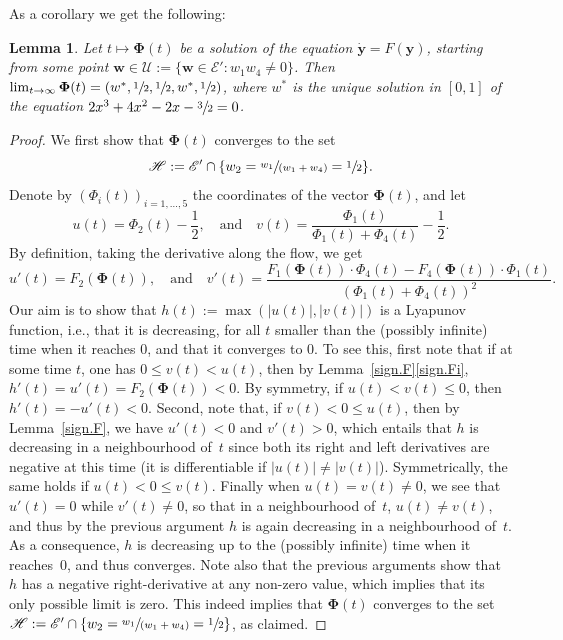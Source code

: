 \documentclass[11pt]{article}
\newcommand{\ie}{i.e.,\xspace}
\let\mathcal\mathscr
\let \nicefrac\sfrac
\newcommand{\spfrac}[2]{\sfrac{#1}{(#2)}}
\numberwithin{equation}{section}
\newtheorem{lemma}[theorem]{Lemma}
\theoremstyle{definition}
\let\bs\boldsymbol
\begin{document}
As a corollary we get the following:
\begin{lemma}\label{lem:conv.lozenge}
Let $t\mapsto \bs \Phi(t)$ be a solution of the equation ${\bs{\dot y}} =F({\bs y})$, starting from some point $\bs w\in \mathcal U:=\{\bs w \in \mathcal E' : w_1w_4\neq 0\}$.
Then $\lim_{t\to \infty} \bs \Phi(t) = (w^*, \nicefrac12, \nicefrac12, w^*, \nicefrac12)$, where $w^*$ is the unique solution in $[0,1]$ of the equation $2x^3+4x^2-2x-\sfrac32=0$.
\end{lemma}
\begin{proof}
We first show that $\bs \Phi(t)$ converges to the set
\[
\mathcal H:= \mathcal E'\cap \{w_2={\spfrac{w_1}{w_1+w_4}}=\nicefrac12\}.
\]
Denote by $(\Phi_i(t))_{i=1,\dots,5}$ the coordinates of the vector $\bs \Phi(t)$, and let
\[
u(t) = \Phi_2(t) - \frac12, \quad \text{and}\quad v(t) = \frac{\Phi_1(t)}{\Phi_1(t)+ \Phi_4(t)} - \frac12.
\]
By definition, taking the derivative along the flow, we get
\[
u'(t) = F_2 (\bs \Phi(t)), \quad \text{and}\quad v'(t) = \frac{F_1(\bs \Phi(t))\cdot \Phi_4(t) - F_4(\bs \Phi(t))\cdot\Phi_1(t)}{(\Phi_1(t) + \Phi_4(t))^2 }.
\]
Our aim is to show that $h(t):=\max(|u(t)|,|v(t)|)$ is a Lyapunov function, \ie that it is decreasing, for all $t$ smaller than the (possibly infinite) time when it reaches $0$, and that it converges to $0$. To see this, first note that if at some time $t$, one has $0\le v(t)<u(t)$,
then by Lemma~\ref{sign.F}\eqref{sign.Fi}, $h'(t) = u'(t) = F_2(\bs \Phi(t)) <0$. By symmetry, if $u(t)<v(t) \le 0$, then $h'(t) = -u'(t) <0$.
Second, note that, if $v(t) < 0 \le u(t)$, then by Lemma~\ref{sign.F}, we have $u'(t) <0$ and $v'(t)>0$, which entails that $h$ is decreasing in a neighbourhood of~$t$ since both its right and left derivatives are negative at this time (it is differentiable if $|u(t)|\neq |v(t)|$).
Symmetrically, the same holds if $u(t)<0\le v(t)$.
Finally when $u(t) = v(t)\neq 0$, we see that $u'(t) = 0$ while
$v'(t)\neq 0$, so that in a neighbourhood of~$t$,
$u(t)\neq v(t)$, and thus by the previous argument $h$ is again decreasing in a neighbourhood of~$t$.
As a consequence, $h$ is decreasing up to the (possibly infinite) time when it reaches~$0$, and thus converges. Note also that the previous arguments show that~$h$ has a negative right-derivative at any non-zero value, which implies that its only possible limit is zero.
This indeed implies that $\bs \Phi(t)$ converges to the set $\mathcal H:= \mathcal E'\cap \{w_2={\spfrac{w_1}{w_1+w_4}}=\nicefrac12\}$, as claimed.


\end{proof}
\end{document}
